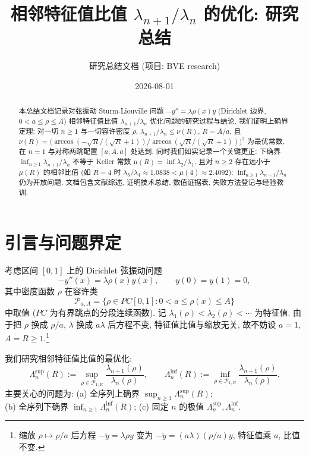 \documentclass[UTF8]{ctexart}
\title{相邻特征值比值 \texorpdfstring{$\lambda_{n+1}/\lambda_n$}{lambda_{n+1}/lambda_n} 的优化: 研究总结}
\author{研究总结文档 (项目: BVE research)}
\date{2026-08-01}
\begin{document}
\maketitle

\begin{abstract}
本总结文档记录对弦振动 Sturm-Liouville 问题
$-y'' = \lambda\rho(x)y$ (Dirichlet 边界, $0 < a \leq \rho \leq A$)
相邻特征值比值 $\lambda_{n+1}/\lambda_n$ 优化问题的研究过程与结论.
我们证明上确界定理: 对一切 $n \geq 1$ 与一切容许密度 $\rho$,
$\lambda_{n+1}/\lambda_n \leq \nu(R)$, $R = A/a$,
且 $\nu(R) = \bigl(\arccos(-\sqrt{R}/(\sqrt{R}+1)) / \arccos(\sqrt{R}/(\sqrt{R}+1))\bigr)^2$
为最优常数, 在 $n = 1$ 与对称两跳配置 $[a,A,a]$ 处达到.
同时我们如实记录一个关键更正: 下确界 $\inf_{n\geq 1} \lambda_{n+1}/\lambda_n$
不等于 Keller 常数 $\mu(R) = \inf \lambda_2/\lambda_1$,
且对 $n \geq 2$ 存在远小于 $\mu(R)$ 的相邻比值 (如 $R=4$ 时
$\lambda_5/\lambda_4 \approx 1.0838 < \mu(4) \approx 2.4092$);
$\inf_{n\geq 1}\lambda_{n+1}/\lambda_n$ 仍为开放问题.
文档包含文献综述, 证明技术总结, 数值证据表, 失败方法登记与经验教训.
\end{abstract}

\tableofcontents

\section{引言与问题界定}

考虑区间 $[0,1]$ 上的 Dirichlet 弦振动问题
\begin{equation}
	-y''(x) = \lambda\rho(x)y(x), \qquad y(0) = y(1) = 0,
\end{equation}
其中密度函数 $\rho$ 在容许类
\begin{equation}
	\mathcal{P}_{a,A} = \bigl\{ \rho \in PC[0,1] : 0 < a \leq \rho(x) \leq A \bigr\}
\end{equation}
中取值 ($PC$ 为有界跳点的分段连续函数). 记 $\lambda_1(\rho) < \lambda_2(\rho) < \cdots$
为特征值. 由于把 $\rho$ 换成 $\rho/a$, $\lambda$ 换成 $a\lambda$ 后方程不变,
特征值比值与缩放无关, 故不妨设 $a = 1$, $A = R \geq 1$.\footnote{缩放 $\rho \mapsto \rho/a$ 后方程 $-\ddot y = \lambda \rho y$ 变为 $-\ddot y = (a\lambda)(\rho/a) y$, 特征值乘 $a$, 比值不变.}

我们研究相邻特征值比值的最优化:
\begin{equation}
	\Lambda_n^{\sup}(R) := \sup_{\rho \in \mathcal{P}_{1,R}} \frac{\lambda_{n+1}(\rho)}{\lambda_n(\rho)},
	\qquad
	\Lambda_n^{\inf}(R) := \inf_{\rho \in \mathcal{P}_{1,R}} \frac{\lambda_{n+1}(\rho)}{\lambda_n(\rho)}.
\end{equation}
主要关心的问题为: (a) 全序列上确界 $\sup_{n\geq 1} \Lambda_n^{\sup}(R)$;\\
(b) 全序列下确界 $\inf_{n\geq 1} \Lambda_n^{\inf}(R)$; (c) 固定 $n$ 的极值 $\Lambda_n^{\sup}, \Lambda_n^{\inf}$.
\end{document}

